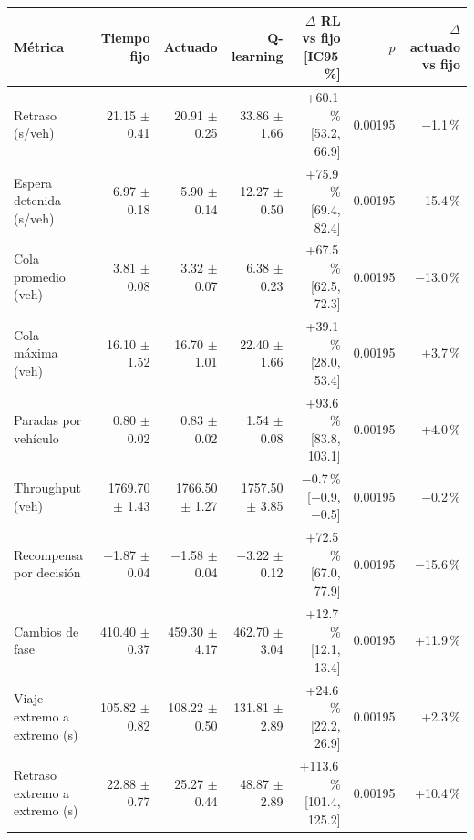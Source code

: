 \begin{table}[H]
\centering
\scriptsize
\setlength{\tabcolsep}{3pt}
\setlength{\tabcolsep}{2pt}
\begin{tabular}{lrrrrrr}
\toprule
Métrica & Tiempo fijo & Actuado & Q-learning & \makecell{$\Delta$ RL vs fijo\\{}[IC95\,\%]} & $p$ & \makecell{$\Delta$ actuado\\vs fijo} \\
\midrule
Retraso (s/veh) & 21.15 $\pm$ 0.41 & 20.91 $\pm$ 0.25 & 33.86 $\pm$ 1.66 & \makecell{+60.1\,\%\\{}[53.2, 66.9]} & 0.00195 & $-$1.1\,\% \\
Espera detenida (s/veh) & 6.97 $\pm$ 0.18 & 5.90 $\pm$ 0.14 & 12.27 $\pm$ 0.50 & \makecell{+75.9\,\%\\{}[69.4, 82.4]} & 0.00195 & $-$15.4\,\% \\
Cola promedio (veh) & 3.81 $\pm$ 0.08 & 3.32 $\pm$ 0.07 & 6.38 $\pm$ 0.23 & \makecell{+67.5\,\%\\{}[62.5, 72.3]} & 0.00195 & $-$13.0\,\% \\
Cola máxima (veh) & 16.10 $\pm$ 1.52 & 16.70 $\pm$ 1.01 & 22.40 $\pm$ 1.66 & \makecell{+39.1\,\%\\{}[28.0, 53.4]} & 0.00195 & +3.7\,\% \\
Paradas por vehículo & 0.80 $\pm$ 0.02 & 0.83 $\pm$ 0.02 & 1.54 $\pm$ 0.08 & \makecell{+93.6\,\%\\{}[83.8, 103.1]} & 0.00195 & +4.0\,\% \\
Throughput (veh) & 1769.70 $\pm$ 1.43 & 1766.50 $\pm$ 1.27 & 1757.50 $\pm$ 3.85 & \makecell{$-$0.7\,\%\\{}[$-$0.9, $-$0.5]} & 0.00195 & $-$0.2\,\% \\
Recompensa por decisión & $-$1.87 $\pm$ 0.04 & $-$1.58 $\pm$ 0.04 & $-$3.22 $\pm$ 0.12 & \makecell{+72.5\,\%\\{}[67.0, 77.9]} & 0.00195 & $-$15.6\,\% \\
Cambios de fase & 410.40 $\pm$ 0.37 & 459.30 $\pm$ 4.17 & 462.70 $\pm$ 3.04 & \makecell{+12.7\,\%\\{}[12.1, 13.4]} & 0.00195 & +11.9\,\% \\
Viaje extremo a extremo (s) & 105.82 $\pm$ 0.82 & 108.22 $\pm$ 0.50 & 131.81 $\pm$ 2.89 & \makecell{+24.6\,\%\\{}[22.2, 26.9]} & 0.00195 & +2.3\,\% \\
Retraso extremo a extremo (s) & 22.88 $\pm$ 0.77 & 25.27 $\pm$ 0.44 & 48.87 $\pm$ 2.89 & \makecell{+113.6\,\%\\{}[101.4, 125.2]} & 0.00195 & +10.4\,\% \\

\end{tabular}
\end{table}
